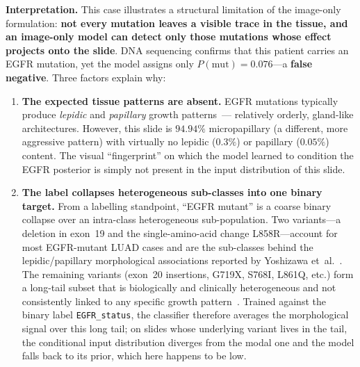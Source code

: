 \textbf{Interpretation.}
This case illustrates a structural limitation of the
image-only formulation: \textbf{not every mutation leaves a
visible trace in the tissue, and an image-only model can detect
only those mutations whose effect projects onto the slide}.
DNA sequencing confirms that this patient carries an EGFR
mutation, yet the model assigns only $P(\text{mut}) = 0.076$---a
\textbf{false negative}.
Three factors explain why:

\begin{enumerate}
    \item \textbf{The expected tissue patterns are absent.}
    EGFR mutations typically produce \emph{lepidic} and
    \emph{papillary} growth patterns~\cite{yoshizawa2013egfrmorph}---%
    relatively orderly, gland-like architectures.
    However, this slide is $94.94\%$ micropapillary (a different,
    more aggressive pattern) with virtually no lepidic ($0.3\%$)
    or papillary ($0.05\%$) content.
    The visual ``fingerprint'' on which the model learned to
    condition the EGFR posterior is simply not present in the
    input distribution of this slide.

    \item \textbf{The label collapses heterogeneous sub-classes
    into one binary target.}
    From a labelling standpoint, ``EGFR mutant'' is a coarse
    binary collapse over an intra-class heterogeneous sub-population.
    Two variants---a deletion in exon~19 and the single-amino-acid
    change L858R---account for most EGFR-mutant LUAD cases and
    are the sub-classes behind the lepidic/papillary
    morphological associations reported by Yoshizawa
    et~al.~\cite{yoshizawa2013egfrmorph}.
    The remaining variants (exon~20 insertions, G719X, S768I,
    L861Q, etc.) form a long-tail subset that is biologically
    and clinically heterogeneous and not consistently linked to
    any specific growth
    pattern~\cite{brindel2020uncommonegfr}.
    Trained against the binary label \texttt{EGFR\_status}, the
    classifier therefore averages the morphological signal over
    this long tail; on slides whose underlying variant lives in
    the tail, the conditional input distribution diverges from
    the modal one and the model falls back to its prior, which
    here happens to be low.


\end{enumerate}
